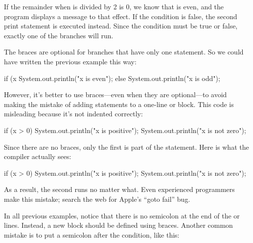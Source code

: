 
If the remainder when  is divided by 2 is 0, we know that  is even, and the program displays a message to that effect.
If the condition is false, the second print statement is executed instead.
Since the condition must be true or false, exactly one of the branches will run.

The braces are optional for branches that have only one statement.
So we could have written the previous example this way:

\begin{code}
if (x %
    System.out.println("x is even");
else
    System.out.println("x is odd");
\end{code}

However, it's better to use braces---even when they are optional---to avoid making the mistake of adding statements to a one-line  or  block.
This code is misleading because it's not indented correctly:

\begin{code}
if (x > 0)
    System.out.println("x is positive");
    System.out.println("x is not zero");
\end{code}

Since there are no braces, only the first  is part of the  statement.
Here is what the compiler actually sees:

\begin{code}
if (x > 0) {
    System.out.println("x is positive");
}
    System.out.println("x is not zero");
\end{code}

As a result, the second  runs no matter what.
Even experienced programmers make this mistake; search the web for Apple's ``goto fail'' bug.


In all previous examples, notice that there is no semicolon at the end of the  or  lines.
Instead, a new block should be defined using braces.
Another common mistake is to put a semicolon after the condition, like this:


